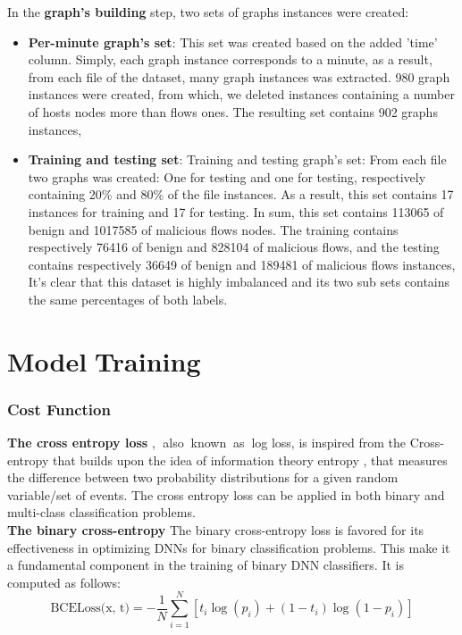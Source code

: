 In the \textbf{graph's building} step, two sets of graphs instances were created:
\begin{itemize}
    \item \textbf{Per-minute graph's set}: This set was created based on the added 'time' column. Simply, each graph instance corresponds to a minute, as a result, from each file of the dataset, many graph instances was extracted. 980 graph instances were created, from which, we deleted instances containing a number of hosts nodes more than flows ones. The resulting set contains 902 graphs instances,
    \item \textbf{Training and testing set}:
Training and testing graph's set: From each file two graphs was created: One for testing and one for testing, respectively containing  20\%  and  80\%  of the file instances. As a result, this set contains 17 instances for training and 17 for testing. In sum, this set contains 113065  of benign and 1017585 of malicious flows nodes. The training contains respectively 76416 of benign and 828104 of malicious flows, and the testing contains respectively 36649 of benign and 189481 of malicious flows instances, It's clear that this dataset is highly imbalanced and its two sub sets contains the same percentages of both labels.
\end{itemize} 





\section{Model\textcolor{white}{.}Training} 

\subsubsection{Cost Function}
\textbf{The cross entropy loss} \cite{cross_entropy_loss} \cite{cross_entropy_loss_1}, \textcolor{white}{.}also\textcolor{white}{..}known\textcolor{white}{..}as\textcolor{white}{..}log loss, is inspired from the Cross-entropy that builds upon the idea of information theory entropy \cite{entropy}, that measures the difference between two probability distributions for a given random variable/set of events.
The cross entropy loss can be applied in both binary and multi-class classification problems.\\
 \textbf{The binary cross-entropy} 
The binary cross-entropy loss \cite{cross_entropy_loss_1} 
 is favored for its effectiveness in optimizing DNNs for binary classification problems. This make it a fundamental component in the training of binary DNN classifiers. It is computed as follows:
\begin{equation}
\text{BCELoss(x, t)} = -\frac{1}{N} \sum_{i=1}^{N} \left[ t_i \log(p_i) + (1 - t_i) \log(1 - p_i) \right]
\end{equation}


